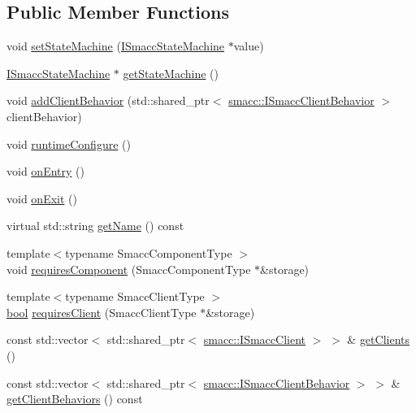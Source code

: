 \subsection*{Public Member Functions}
\begin{DoxyCompactItemize}
\item 
void \hyperlink{classsmacc_1_1ISmaccOrthogonal_a0fa0901a322f62a604c279c06d34f2f0}{set\+State\+Machine} (\hyperlink{classsmacc_1_1ISmaccStateMachine}{I\+Smacc\+State\+Machine} $\ast$value)
\item 
\hyperlink{classsmacc_1_1ISmaccStateMachine}{I\+Smacc\+State\+Machine} $\ast$ \hyperlink{classsmacc_1_1ISmaccOrthogonal_aae265ec480b8ed552ddc79afd2d93a62}{get\+State\+Machine} ()
\item 
void \hyperlink{classsmacc_1_1ISmaccOrthogonal_abd9c9e88ff8d5c87a496c4ffa427c423}{add\+Client\+Behavior} (std\+::shared\+\_\+ptr$<$ \hyperlink{classsmacc_1_1ISmaccClientBehavior}{smacc\+::\+I\+Smacc\+Client\+Behavior} $>$ client\+Behavior)
\item 
void \hyperlink{classsmacc_1_1ISmaccOrthogonal_a47ae4af0f05ea31cc98b4e1d792d1126}{runtime\+Configure} ()
\item 
void \hyperlink{classsmacc_1_1ISmaccOrthogonal_a35f4d2955445dc1a4b2dafbca2f0bd16}{on\+Entry} ()
\item 
void \hyperlink{classsmacc_1_1ISmaccOrthogonal_af7c30055b3cef6f65a83ae412ab34143}{on\+Exit} ()
\item 
virtual std\+::string \hyperlink{classsmacc_1_1ISmaccOrthogonal_a45a444be97410cb061f8b9d5d77ee9b7}{get\+Name} () const
\item 
{\footnotesize template$<$typename Smacc\+Component\+Type $>$ }\\void \hyperlink{classsmacc_1_1ISmaccOrthogonal_a3f66cf4680e3026a6789769c8ea1aa83}{requires\+Component} (Smacc\+Component\+Type $\ast$\&storage)
\item 
{\footnotesize template$<$typename Smacc\+Client\+Type $>$ }\\\hyperlink{classbool}{bool} \hyperlink{classsmacc_1_1ISmaccOrthogonal_a602e16b09f8a1b3de889f2f3d90a3211}{requires\+Client} (Smacc\+Client\+Type $\ast$\&storage)
\item 
const std\+::vector$<$ std\+::shared\+\_\+ptr$<$ \hyperlink{classsmacc_1_1ISmaccClient}{smacc\+::\+I\+Smacc\+Client} $>$ $>$ \& \hyperlink{classsmacc_1_1ISmaccOrthogonal_a83f1d5390ec41d91566e6f034b25b7d9}{get\+Clients} ()
\item 
const std\+::vector$<$ std\+::shared\+\_\+ptr$<$ \hyperlink{classsmacc_1_1ISmaccClientBehavior}{smacc\+::\+I\+Smacc\+Client\+Behavior} $>$ $>$ \& \hyperlink{classsmacc_1_1ISmaccOrthogonal_adf67a263e149fc2e96591484b5e9c7aa}{get\+Client\+Behaviors} () const

\end{DoxyCompactItemize}
